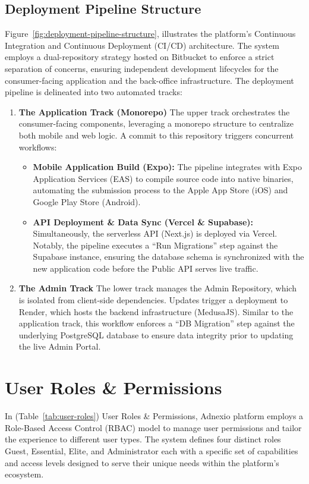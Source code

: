 \subsection{Deployment Pipeline Structure}
Figure~\ref{fig:deployment-pipeline-structure}, illustrates the platform’s Continuous Integration and Continuous Deployment (CI/CD) architecture. The system employs a dual-repository strategy hosted on Bitbucket to enforce a strict separation of concerns, ensuring independent development lifecycles for the consumer-facing application and the back-office infrastructure. 
The deployment pipeline is delineated into two automated tracks:
\begin{enumerate}
    \item \textbf{The Application Track (Monorepo)} The upper track orchestrates the consumer-facing components, leveraging a monorepo structure to centralize both mobile and web logic. A commit to this repository triggers concurrent workflows:
    \begin{itemize}
        \item \textbf{Mobile Application Build (Expo):} The pipeline integrates with Expo Application Services (EAS) to compile source code into native binaries, automating the submission process to the Apple App Store (iOS) and Google Play Store (Android).
        \item \textbf{API Deployment \& Data Sync (Vercel \& Supabase):} Simultaneously, the serverless API (Next.js) is deployed via Vercel. Notably, the pipeline executes a ``Run Migrations'' step against the Supabase instance, ensuring the database schema is synchronized with the new application code before the Public API serves live traffic.
    \end{itemize}
    \item \textbf{The Admin Track} The lower track manages the Admin Repository, which is isolated from client-side dependencies. Updates trigger a deployment to Render, which hosts the backend infrastructure (MedusaJS). Similar to the application track, this workflow enforces a ``DB Migration'' step against the underlying PostgreSQL database to ensure data integrity prior to updating the live Admin Portal.
\end{enumerate}
\newpage
\section{User Roles \& Permissions}
\label{section:user-roles-permissions}

In (Table~\ref{tab:user-roles}) User Roles \& Permissions, Adnexio platform employs a Role-Based Access Control (RBAC) model to manage user permissions and tailor the experience to different user types. The system defines four distinct roles Guest, Essential, Elite, and Administrator each with a specific set of capabilities and access levels designed to serve their unique needs within the platform's ecosystem.

